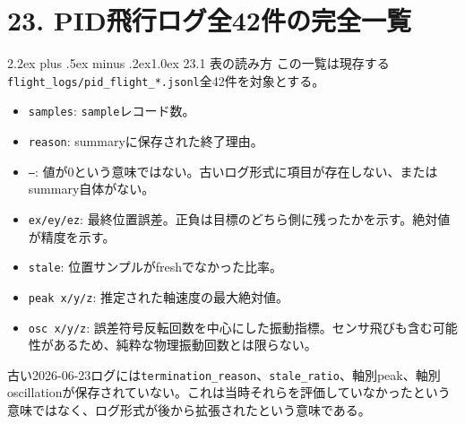 \documentclass[10pt,a4paper,openany]{ltjsbook}
\makeatletter
\renewcommand\section{\@startsection{section}{1}{0pt}%
  {2.2ex plus .5ex minus .2ex}{1.0ex}%
  {\sffamily\Large\bfseries\color{ReportNavy}}}
\makeatother
\begin{document}
\chapter{23. PID飛行ログ全42件の完全一覧}
\section{23.1 表の読み方}
この一覧は現存する\texttt{flight\_logs/pid\_flight\_*.jsonl}全42件を対象とする。\par
\begin{itemize}
\item \texttt{samples}: \texttt{sample}レコード数。
\item \texttt{reason}: summaryに保存された終了理由。
\item \texttt{—}: 値が0という意味ではない。古いログ形式に項目が存在しない、またはsummary自体がない。
\item \texttt{ex/ey/ez}: 最終位置誤差。正負は目標のどちら側に残ったかを示す。絶対値が精度を示す。
\item \texttt{stale}: 位置サンプルがfreshでなかった比率。
\item \texttt{peak x/y/z}: 推定された軸速度の最大絶対値。
\item \texttt{osc x/y/z}: 誤差符号反転回数を中心にした振動指標。センサ飛びも含む可能性があるため、純粋な物理振動回数とは限らない。
\end{itemize}
古い2026-06-23ログには\texttt{termination\_reason}、\texttt{stale\_ratio}、軸別peak、軸別oscillationが保存されていない。これは当時それらを評価していなかったという意味ではなく、ログ形式が後から拡張されたという意味である。\par
\end{document}
